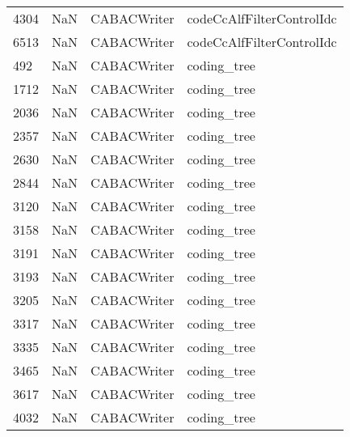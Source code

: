 \begin{tabular}{llll}
4304 &                   NaN &                CABACWriter &                 codeCcAlfFilterControlIdc \\
6513 &                   NaN &                CABACWriter &                 codeCcAlfFilterControlIdc \\
492  &                   NaN &                CABACWriter &                               coding\_tree \\
1712 &                   NaN &                CABACWriter &                               coding\_tree \\
2036 &                   NaN &                CABACWriter &                               coding\_tree \\
2357 &                   NaN &                CABACWriter &                               coding\_tree \\
2630 &                   NaN &                CABACWriter &                               coding\_tree \\
2844 &                   NaN &                CABACWriter &                               coding\_tree \\
3120 &                   NaN &                CABACWriter &                               coding\_tree \\
3158 &                   NaN &                CABACWriter &                               coding\_tree \\
3191 &                   NaN &                CABACWriter &                               coding\_tree \\
3193 &                   NaN &                CABACWriter &                               coding\_tree \\
3205 &                   NaN &                CABACWriter &                               coding\_tree \\
3317 &                   NaN &                CABACWriter &                               coding\_tree \\
3335 &                   NaN &                CABACWriter &                               coding\_tree \\
3465 &                   NaN &                CABACWriter &                               coding\_tree \\
3617 &                   NaN &                CABACWriter &                               coding\_tree \\
4032 &                   NaN &                CABACWriter &                               coding\_tree \\

\end{tabular}
